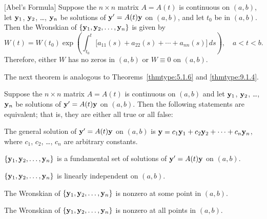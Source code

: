 \begin{theorem}
  \color{blue}
  $[$Abel's Formula$]$ \label{thmtype:10.3.2} Suppose the $n\times n$ matrix $A=A(t)$ is continuous
  on $(a,b)$, let ${\bf y}_{1}$, ${\bf y}_{2}$, \dots, ${\bf y}_{n}$ be solutions of
  ${\bf y}'=A(t){\bf y}$ on $(a,b)$, and let $t_{0}$ be in $(a,b)$. Then the Wronskian of
  $\{{\bf y}_{1},{\bf y}_{2},\dots,{\bf y}_{n}\}$ is given by
  \begin{equation}
    \label{eq:10.3.6}W(t)=W(t_{0})\exp\left( \int^{t}_{t_{0}}\big[a_{11}(s)+a_{22}(s)+\cdots+a_{nn}(s)]\, ds\right),\quad a<t<b.
  \end{equation}
  Therefore, either $W$ has no zeros in $(a,b)$ or $W\equiv0$ on $(a,b)$.
\end{theorem}

\color{blue}
\color{black}

The next theorem is analogous to Theorems~\ref{thmtype:5.1.6} and \ref{thmtype:9.1.4}.

\begin{theorem}
  \color{blue}
  \label{thmtype:10.3.3} Suppose the $n\times n$ matrix $A=A(t)$ is continuous on $(a,b)$ and let
  ${\bf y}_{1}$, ${\bf y}_{2}$, \dots,${\bf y}_{n}$ be solutions of ${\bf y}'=A(t){\bf y}$ on
  $(a,b)$. Then the following statements are equivalent; that is, they are either all true or all
  false:
  \begin{alist}
    \item %
    The general solution of ${\bf y}'=A(t){\bf y}$ on $(a,b)$ is
    ${\bf y}=c_{1}{\bf y}_{1}+c_{2}{\bf y}_{2}+\cdots+c_{n}{\bf y}_{n}$, where $c_{1}$, $c_{2}$,
    \dots, $c_{n}$ are arbitrary constants.

    \item %
    $\{{\bf y}_{1},{\bf y}_{2},\dots,{\bf y}_{n}\}$ is a fundamental set of solutions of
    ${\bf y}'=A(t){\bf y}$ on $(a,b)$.

    \item %
    $\{{\bf y}_{1},{\bf y}_{2},\dots,{\bf y}_{n}\}$ is linearly independent on $(a,b)$.

    \item %
    The Wronskian of $\{{\bf y}_{1},{\bf y}_{2},\dots,{\bf y}_{n}\}$ is nonzero at some point in
    $(a,b)$.

    \item %
    The Wronskian of $\{{\bf y}_{1},{\bf y}_{2},\dots,{\bf y}_{n}\}$ is nonzero at all points in
    $(a,b)$.
  \end{alist}
\end{theorem}


